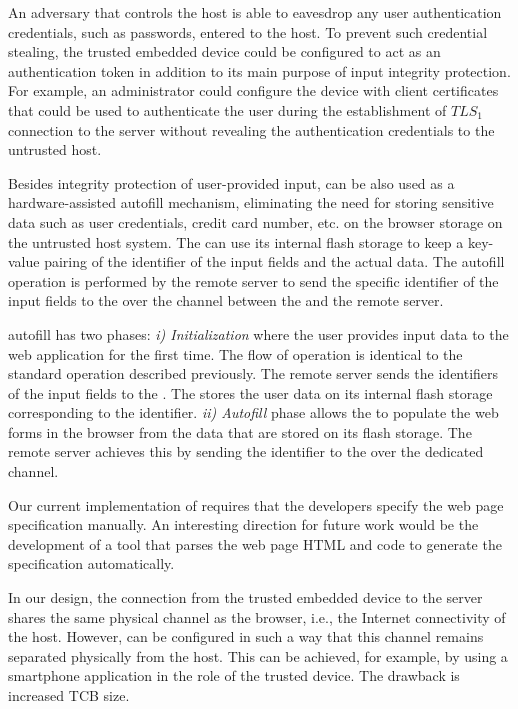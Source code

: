  An adversary that controls the host is able to eavesdrop any user authentication credentials, such as passwords, entered to the host. To prevent such credential stealing, the trusted embedded device could be configured to act as an authentication token in addition to its main purpose of input integrity protection. For example, an administrator could configure the device with client certificates that could be used to authenticate the user during the establishment of $TLS_1$ connection to the server without revealing the authentication credentials to the untrusted host.

 Besides integrity protection of user-provided input, \device can be also used as a hardware-assisted autofill mechanism, eliminating the need for storing sensitive data such as user credentials, credit card number, etc. on the browser storage on the untrusted host system. The \device can use its internal flash storage to keep a key-value pairing of the identifier of the input fields and the actual data. The autofill operation is performed by the remote server to send the specific identifier of the input fields to the \device over the \tls channel between the \device and the remote server. 

\name autofill has two phases: 
\emph{i) Initialization} where the user provides input data to the web application for the first time. The flow of operation is identical to the standard \name operation described previously. The remote server sends the identifiers of the input fields to the \device. The \device stores the user data on its internal flash storage corresponding to the identifier. \emph{ii) Autofill} phase allows the \device to populate the web forms in the browser from the data that are stored on its flash storage. The remote server achieves this by sending the identifier to the \device over the dedicated \tls channel.

 Our current implementation of \tool requires that the developers specify the web page specification manually. An interesting direction for future work would be the development of a tool that parses the web page HTML and \js code to generate the specification automatically. 

 In our design, the connection from the trusted embedded device to the server shares the same physical channel as the browser, i.e., the Internet connectivity of the host. However, \tool can be configured in such a way that this channel remains separated physically from the host. This can be achieved, for example, by using a smartphone application in the role of the trusted device. The drawback is increased TCB size.

